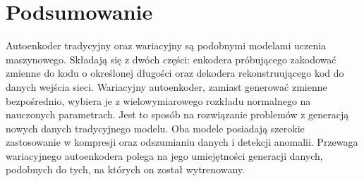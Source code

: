 \documentclass[a4paper,12pt,oneside]{book} %
\begin{document}
\chapter{Podsumowanie}
Autoenkoder tradycyjny oraz wariacyjny są podobnymi modelami uczenia maszynowego. Składają się z dwóch części: enkodera próbującego zakodować zmienne do kodu o określonej długości oraz dekodera rekonstruującego kod do danych wejścia sieci. Wariacyjny autoenkoder, zamiast generować zmienne bezpośrednio, wybiera je z wielowymiarowego rozkładu normalnego na nauczonych parametrach. Jest to sposób na rozwiązanie problemów z generacją nowych danych tradycyjnego modelu. Oba modele posiadają szerokie zastosowanie w kompresji oraz odszumianiu danych i detekcji anomalii. Przewaga wariacyjnego autoenkodera polega na jego umiejętności generacji danych, podobnych do tych, na których on został wytrenowany. 


\listoffigures{}

\listofcodes{}

%
\printbibliography[title=Bibliografia]
%
\end{document}
